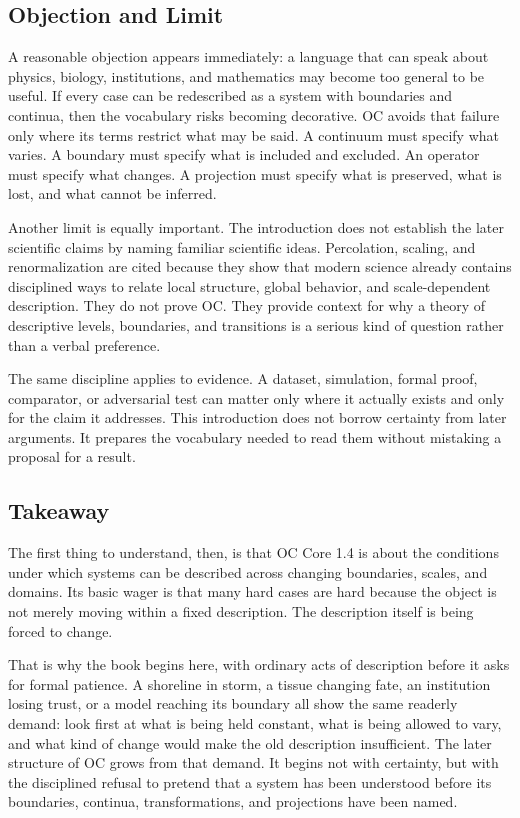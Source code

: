 \documentclass[11pt,a4paper,openany]{book}
\begin{document}
\subsection{Objection and Limit}
A reasonable objection appears immediately: a language that can speak about physics, biology, institutions, and mathematics may become too general to be useful. If every case can be redescribed as a system with boundaries and continua, then the vocabulary risks becoming decorative. OC avoids that failure only where its terms restrict what may be said. A continuum must specify what varies. A boundary must specify what is included and excluded. An operator must specify what changes. A projection must specify what is preserved, what is lost, and what cannot be inferred. \cite{grimmett_percolation,goldenfeld_lectures}\par
Another limit is equally important. The introduction does not establish the later scientific claims by naming familiar scientific ideas. Percolation, scaling, and renormalization are cited because they show that modern science already contains disciplined ways to relate local structure, global behavior, and scale-dependent description. They do not prove OC. They provide context for why a theory of descriptive levels, boundaries, and transitions is a serious kind of question rather than a verbal preference.\par
The same discipline applies to evidence. A dataset, simulation, formal proof, comparator, or adversarial test can matter only where it actually exists and only for the claim it addresses. This introduction does not borrow certainty from later arguments. It prepares the vocabulary needed to read them without mistaking a proposal for a result.\par
\subsection{Takeaway}
The first thing to understand, then, is that OC Core 1.4 is about the conditions under which systems can be described across changing boundaries, scales, and domains. Its basic wager is that many hard cases are hard because the object is not merely moving within a fixed description. The description itself is being forced to change. \cite{grimmett_percolation,goldenfeld_lectures}\par
That is why the book begins here, with ordinary acts of description before it asks for formal patience. A shoreline in storm, a tissue changing fate, an institution losing trust, or a model reaching its boundary all show the same readerly demand: look first at what is being held constant, what is being allowed to vary, and what kind of change would make the old description insufficient. The later structure of OC grows from that demand. It begins not with certainty, but with the disciplined refusal to pretend that a system has been understood before its boundaries, continua, transformations, and projections have been named.\par
\end{document}
